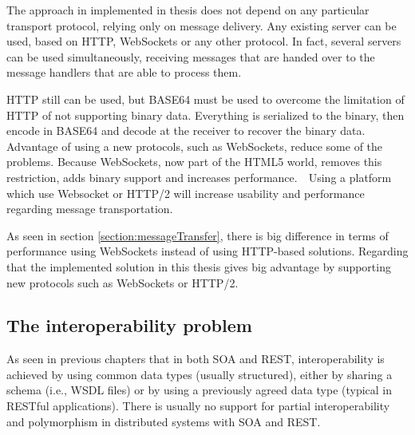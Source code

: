 The approach in implemented in thesis does not depend on any particular transport protocol, relying only on message delivery. Any existing server can be used, based on HTTP, WebSockets or any other protocol. In fact, several servers can be used simultaneously, receiving messages that are handed over to the message handlers that are able to process them.

HTTP still can be used, but BASE64 must be used to overcome the limitation of HTTP of not supporting binary data. Everything is serialized to the binary, then encode in BASE64 and decode at the receiver to recover the binary data. Advantage of using a new protocols, such as WebSockets, reduce some of the problems. Because WebSockets, now part of the HTML5 world, removes this restriction, adds binary support and increases performance.   Using a platform which use Websocket or HTTP/2 will increase usability and performance regarding message transportation.

As seen in section \ref{section:messageTransfer}, there is big difference in terms of performance using WebSockets instead of using HTTP-based solutions. Regarding that the implemented solution in this thesis gives big advantage by supporting new protocols such as WebSockets or HTTP/2.

\subsection{The interoperability problem}
\label{section:interoperabilityProblem}

As seen in previous chapters that in both SOA and REST, interoperability is achieved by using common data types (usually structured), either by sharing a schema (i.e., WSDL files) or by using a previously agreed data type (typical in RESTful applications). There is usually no support for partial interoperability and polymorphism in distributed systems with SOA and REST.

